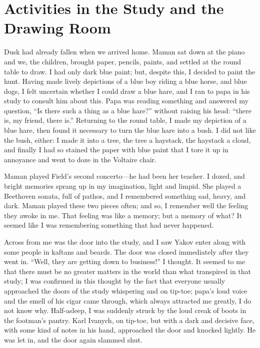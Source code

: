 \chapter{Activities in the Study and the Drawing Room} %

Dusk had already fallen when we arrived home. Maman sat down at the piano and we, the children, brought paper, pencils, paints, and settled at the round table to draw. I had only dark blue paint; but, despite this, I decided to paint the hunt. Having made lively depictions of a blue boy riding a blue horse, and blue dogs, I felt uncertain whether I could draw a blue hare, and I ran to papa in his study to consult him about this. Papa was reading something and answered my question, ``Is there such a thing as a blue hare?'' without raising his head: ``there is, my friend, there is.'' Returning to the round table, I made my depiction of a blue hare, then found it necessary to turn the blue hare into a bush. I did not like the bush, either: I made it into a tree, the tree a haystack, the haystack a cloud, and finally I had so stained the paper with blue paint that I tore it up in annoyance and went to doze in the Voltaire chair.

Maman played Field's second concerto---he had been her teacher. I dozed, and bright memories sprang up in my imagination, light and limpid. She played a Beethoven sonata, full of pathos, and I remembered something sad, heavy, and dark. Maman played these two pieces often; and so, I remember well the feeling they awoke in me. That feeling was like a memory; but a memory of what? It seemed like I was remembering something that had never happened.

 Across from me was the door into the study, and I saw Yakov enter along with some people in kaftans and beards. The door was closed immediately after they went in. ``Well, they are getting down to business!'' I thought. It seemed to me that there must be no greater matters in the world than what transpired in that study; I was confirmed in this thought by the fact that everyone usually approached the doors of the study whispering and on tip-toe; papa's loud voice and the smell of his cigar came through, which always attracted me greatly, I do not know why. Half-asleep, I was suddenly struck by the loud creak of boots in the footman's pantry. Karl Ivanych, on tip-toe, but with a dark and decisive face, with some kind of notes in his hand, approached the door and knocked lightly. He was let in, and the door again slammed shut.

